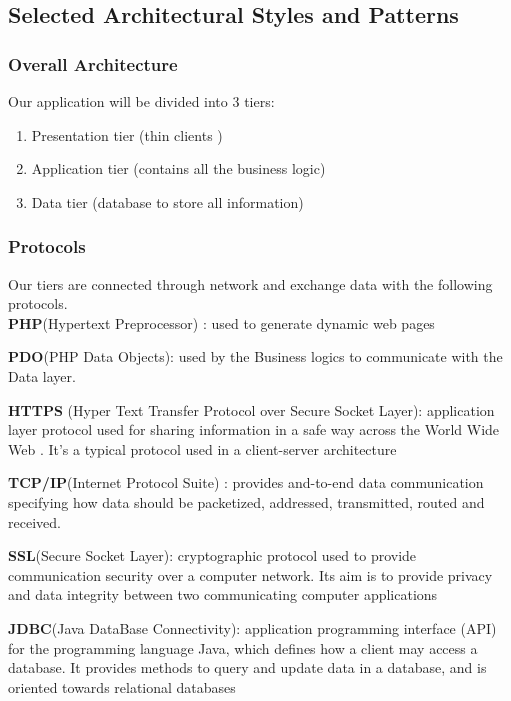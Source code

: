 \documentclass{article}
\begin{document}
\begin{flushleft}
\subsection{Selected Architectural Styles and Patterns} %
\subsubsection{Overall Architecture}
Our application will be divided into 3 tiers:\\
\begin{enumerate}
\item Presentation tier (thin clients )
\item Application tier (contains all the business logic)
\item Data tier (database to store all information)
\end{enumerate}
\subsubsection{Protocols}
Our tiers are connected through network and exchange data with the following protocols.
\vspace{1cm}
\\

\textbf{PHP}(Hypertext Preprocessor) : used to generate dynamic web pages\break\break

\textbf{PDO}(PHP Data Objects): used by the Business logics to communicate with the Data layer. \break\break

\textbf{HTTPS} (Hyper Text Transfer Protocol over Secure Socket Layer): application layer protocol used for sharing information in a safe way across the World Wide Web . It's a typical protocol used in a client-server architecture\break\break

\textbf{TCP/IP}(Internet Protocol Suite) : provides and-to-end data communication specifying how data should be packetized, addressed, transmitted, routed and received.\break\break

\textbf{SSL}(Secure Socket Layer): cryptographic protocol used to provide communication security over a computer network. Its aim is to provide privacy and data integrity between two communicating computer applications\break\break

\textbf{JDBC}(Java DataBase Connectivity): application programming interface (API) for the programming language Java, which defines how a client may access a database. It provides methods to query and update data in a database, and is oriented towards relational databases \break\break


\end{flushleft}
\end{document}
